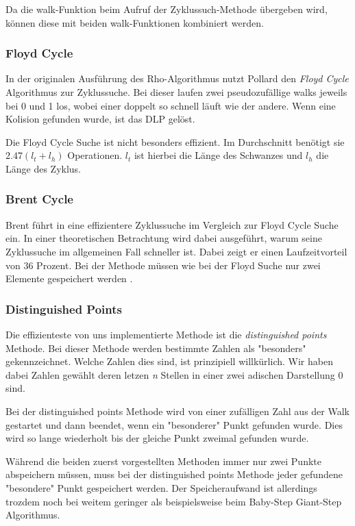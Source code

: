\documentclass{scrartcl}
\begin{document}
Da die walk-Funktion beim Aufruf der Zyklussuch-Methode übergeben wird, können diese mit beiden walk-Funktionen kombiniert werden.

\subsubsection{Floyd Cycle}
\label{sec:floyd_cycle}
In der originalen Ausführung des Rho-Algorithmus nutzt Pollard
den \emph{Floyd Cycle} Algorithmus zur Zyklussuche.
Bei dieser laufen zwei pseudozufällige walks jeweils bei 0 und 1 los,
wobei einer doppelt so schnell läuft wie der andere.
Wenn eine Kolision gefunden wurde, ist das DLP gelöst.

Die Floyd Cycle Suche ist nicht besonders effizient.
Im Durchschnitt benötigt sie \( 2.47(l_t + l_h) \) Operationen.
\( l_t \) ist hierbei die Länge des Schwanzes und \( l_h \) die
Länge des Zyklus.
\cite{Galbraith2012}
\subsubsection{Brent Cycle}
\label{sec:brent_cycle}
Brent führt in \cite{Brent1980}  eine effizientere Zyklussuche im Vergleich zur Floyd Cycle Suche ein. In einer theoretischen Betrachtung wird dabei ausgeführt, warum seine Zyklussuche im allgemeinen Fall schneller ist.
Dabei zeigt er einen Laufzeitvorteil von 36 Prozent.
Bei der Methode müssen wie bei der Floyd Suche nur zwei Elemente gespeichert werden \cite{Galbraith2012}.
\subsubsection{Distinguished Points}
\label{sec:distinguished_points}
Die effizienteste von uns implementierte Methode ist die
\emph{distinguished points} Methode.
Bei dieser Methode werden bestimmte Zahlen als "besonders" gekennzeichnet.
Welche Zahlen dies sind, ist prinzipiell willkürlich.
Wir haben dabei Zahlen gewählt deren letzen \emph{n} Stellen in einer
zwei adischen Darstellung 0 sind.

Bei der distinguished points Methode wird von einer zufälligen Zahl aus
der Walk gestartet und dann beendet, wenn ein "besonderer" Punkt
gefunden wurde.
Dies wird so lange wiederholt bis der gleiche Punkt zweimal gefunden wurde.

Während die beiden zuerst vorgestellten Methoden immer nur zwei Punkte abspeichern müssen,
muss bei der distinguished points Methode jeder gefundene "besondere" Punkt gespeichert werden.
Der Speicheraufwand ist allerdings trozdem noch bei weitem geringer als beispielsweise beim
Baby-Step Giant-Step Algorithmus.
\cite{VanOorschot1999}
\end{document}
